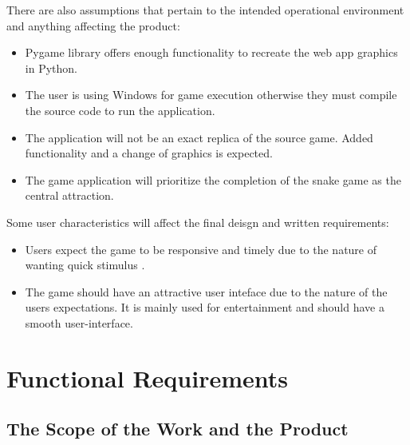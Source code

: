 \documentclass[12pt, titlepage]{article}
\begin{document}
 There are also assumptions that pertain to the intended operational environment and anything affecting the product:
\begin{itemize}
\item Pygame library offers enough functionality to recreate the web app graphics in Python.
\item The user is using Windows for game execution otherwise they must compile the source code to run the application.
\item The application will not be an exact replica of the source game. Added functionality and a change of graphics is expected.
\item The game application will prioritize the completion of the snake game as the central attraction.
\end{itemize}

Some user characteristics will affect the final deisgn and written requirements:
\begin{itemize}
\item Users expect the game to be responsive and timely due to the nature of wanting quick stimulus .
\item The game should have an attractive user inteface due to the nature of the users expectations. It is mainly used for entertainment and should
have a smooth user-interface.
\end{itemize}

\section{Functional Requirements}

\subsection{The Scope of the Work and the Product}
\end{document}
